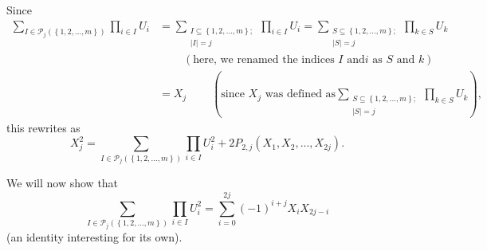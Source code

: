 \documentclass[numbers=enddot,12pt,final,onecolumn,notitlepage]{scrartcl}%
\begin{document}
Since%
\begin{align*}
\sum\limits_{I\in\mathcal{P}_{j}\left(  \left\{  1,2,...,m\right\}  \right)
}\prod\limits_{i\in I}U_{i}  &  =\sum\limits_{\substack{I\subseteq\left\{
1,2,...,m\right\}  ;\\\left\vert I\right\vert =j}}\prod\limits_{i\in I}%
U_{i}=\sum_{\substack{S\subseteq\left\{  1,2,...,m\right\}  ;\\\left\vert
S\right\vert =j}}\prod_{k\in S}U_{k}\\
&  \ \ \ \ \ \ \ \ \ \ \left(  \text{here, we renamed the indices }I\text{ and
}i\text{ as }S\text{ and }k\right) \\
&  =X_{j}\ \ \ \ \ \ \ \ \ \ \left(  \text{since }X_{j}\text{ was defined as
}\sum_{\substack{S\subseteq\left\{  1,2,...,m\right\}  ;\\\left\vert
S\right\vert =j}}\prod_{k\in S}U_{k}\right)  ,
\end{align*}
this rewrites as%
\begin{equation}
X_{j}^{2}=\sum\limits_{I\in\mathcal{P}_{j}\left(  \left\{  1,2,...,m\right\}
\right)  }\prod\limits_{i\in I}U_{i}^{2}+2P_{2,j}\left(  X_{1},X_{2}%
,...,X_{2j}\right)  . \label{4.4.sol.2}%
\end{equation}


We will now show that%
\begin{equation}
\sum\limits_{I\in\mathcal{P}_{j}\left(  \left\{  1,2,...,m\right\}  \right)
}\prod\limits_{i\in I}U_{i}^{2}=\sum\limits_{i=0}^{2j}\left(  -1\right)
^{i+j}X_{i}X_{2j-i} \label{4.4.sol.3}%
\end{equation}
(an identity interesting for its own).
\end{document}
